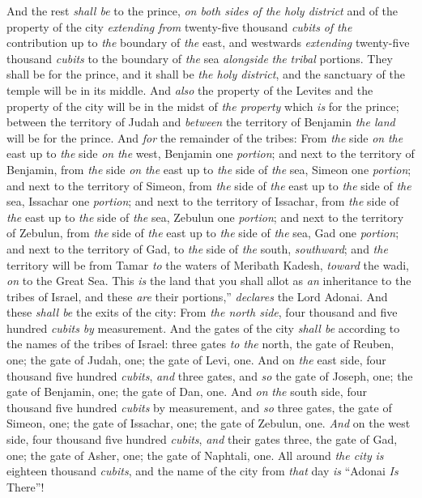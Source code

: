 \begin{biblechapter}
\verse And the rest \textit{shall be} to the prince, \textit{on both sides} \textit{of the holy district} and of the property of the city \textit{extending from} twenty-five thousand \textit{cubits} \textit{of the} contribution up to \textit{the} boundary of \textit{the} east, and westwards \textit{extending} twenty-five thousand \textit{cubits} to the boundary of \textit{the} sea \textit{alongside} \textit{the} \textit{tribal} portions. They shall be for the prince, and it shall be \textit{the holy district}, and the sanctuary of the temple will be in its middle.
\verse And \textit{also} the property of the Levites and the property of the city will be in the midst of \textit{the property} which \textit{is} for the prince; between the territory of Judah and \textit{between} the territory of Benjamin \textit{the land} will be for the prince.
\verse And \textit{for} the remainder of the tribes: From \textit{the} side \textit{on} \textit{the} east up to \textit{the} side \textit{on} \textit{the} west, Benjamin one \textit{portion};
\verse and next to the territory of Benjamin, from \textit{the} side \textit{on} \textit{the} east up to \textit{the} side of \textit{the} sea, Simeon one \textit{portion};
\verse and next to the territory of Simeon, from \textit{the} side of \textit{the} east up to \textit{the} side of \textit{the} sea, Issachar one \textit{portion};
\verse and next to the territory of Issachar, from \textit{the} side of \textit{the} east up to \textit{the} side of \textit{the} sea, Zebulun one \textit{portion};
\verse and next to the territory of Zebulun, from \textit{the} side of \textit{the} east up to \textit{the} side of \textit{the} sea, Gad one \textit{portion};
\verse and next to the territory of Gad, to \textit{the} side of \textit{the} south, \textit{southward}; and \textit{the} territory will be from Tamar \textit{to} the waters of Meribath Kadesh, \textit{toward} the wadi, \textit{on} to the Great Sea.
\verse This \textit{is} the land that you shall allot as \textit{an} inheritance to the tribes of Israel, and these \textit{are} their portions,” \textit{declares} the Lord Adonai.
\verse And these \textit{shall be} the exits of the city: From \textit{the north side}, four thousand and five hundred \textit{cubits}  \textit{by} measurement.
\verse And the gates of the city \textit{shall be} according to the names of the tribes of Israel: three gates \textit{to the} north, the gate of Reuben, one; the gate of Judah, one; the gate of Levi, one.
\verse And on \textit{the} east side, four thousand five hundred \textit{cubits}, \textit{and} three gates, and \textit{so} the gate of Joseph, one; the gate of Benjamin, one; the gate of Dan, one.
\verse And \textit{on} \textit{the} south side, four thousand five hundred \textit{cubits} by measurement, and \textit{so} three gates, the gate of Simeon, one; the gate of Issachar, one; the gate of Zebulun, one.
\verse \textit{And} on the west side, four thousand five hundred \textit{cubits}, \textit{and} their gates three, the gate of Gad, one; the gate of Asher, one; the gate of Naphtali, one.
\verse All around \textit{the city} \textit{is} eighteen thousand \textit{cubits}, and the name of the city from \textit{that} day \textit{is} “Adonai \textit{Is} There”!
\end{biblechapter}


